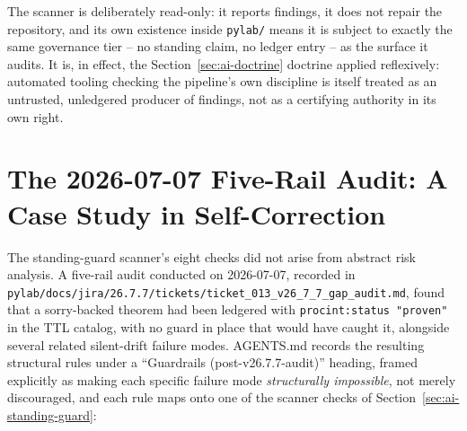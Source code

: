 The scanner is deliberately read-only: it reports findings, it does not
repair the repository, and its own existence inside \texttt{pylab/} means
it is subject to exactly the same governance tier -- no standing claim,
no ledger entry -- as the surface it audits. It is, in effect, the
Section~\ref{sec:ai-doctrine} doctrine applied reflexively: automated
tooling checking the pipeline's own discipline is itself treated as an
untrusted, unledgered producer of findings, not as a certifying
authority in its own right.

\section{The 2026-07-07 Five-Rail Audit: A Case Study in Self-Correction}
\label{sec:ai-guardrail-audit}

The standing-guard scanner's eight checks did not arise from abstract
risk analysis. A five-rail audit conducted on 2026-07-07, recorded in
\texttt{pylab/docs/jira/26.7.7/tickets/ticket\_013\_v26\_7\_7\_gap\_audit.md},
found that a sorry-backed theorem had been ledgered with
\texttt{procint:status "proven"} in the TTL catalog, with no guard in
place that would have caught it, alongside several related silent-drift
failure modes. AGENTS.md records the resulting structural rules under a
``Guardrails (post-v26.7.7-audit)'' heading, framed explicitly as making
each specific failure mode \emph{structurally impossible}, not merely
discouraged, and each rule maps onto one of the scanner checks of
Section~\ref{sec:ai-standing-guard}:

